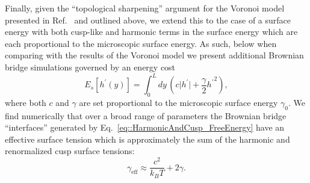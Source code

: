 \documentclass[twoside,twocolumn,9pt]{article}
\begin{document}
Finally, given the ``topological sharpening'' argument for the Voronoi model presented in Ref.~\cite{sussman2018soft} and outlined above, we extend this to the case of a surface energy with both cusp-like and harmonic terms in the surface energy which are each proportional to the microscopic surface energy. As such, below when comparing with the results of the Voronoi model we present additional Brownian bridge simulations governed by an energy cost 
\begin{equation}
    \label{eq::HarmonicAndCusp_FreeEnergy}
    E_s[{h}^{\prime}(y)] = \int_{0}^{L}dy\, \left(c\big|h^{\prime}\big| + \frac{\gamma}{2}{h^{\prime}}^{2}\right),
\end{equation}
where both $c$ and $\gamma$ are set proportional to the microscopic surface energy $\gamma_0$. We find numerically that over a broad range of parameters the Brownian bridge ``interfaces'' generated by Eq.~\ref{eq::HarmonicAndCusp_FreeEnergy} have an effective surface tension which is approximately the sum of the harmonic and renormalized cusp surface tensions:
\begin{equation}
    \label{eq:harmonicAndCuspSurfaceTension}
    \gamma_{\text{eff}} \approx \frac{c^{2}}{k_{B}T} + 2\gamma.
\end{equation}
\end{document}
